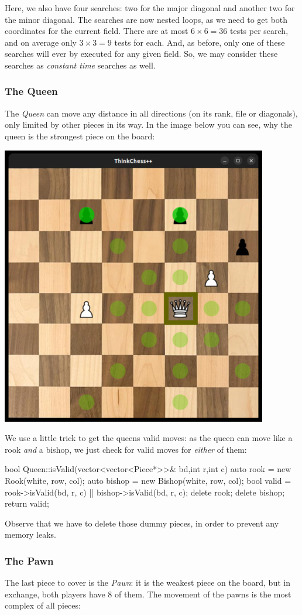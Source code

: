 Here, we also have four searches: two for the major diagonal and another two for the minor
diagonal.
The searches are now nested loops, as we need to get both coordinates for the current field.
There are at most $6 \times 6 = 36$ tests per search, and on average only $3 \times 3 = 9$
tests for each.
And, as before, only one of these searches will ever by executed for any given field.
So, we may consider these searches as \emph{constant time} searches as well.

\subsubsection{The Queen}
The \emph{Queen} can move any distance in all directions (on its rank, file or diagonals),
only limited by other pieces in its way.
In the image below you can see, why the queen is the strongest piece on the board:

\begin{center}
\includegraphics[width=.5\linewidth]{img/queen.jpg}
\end{center}

We use a little trick to get the queens valid moves: as the queen can move like a rook
\emph{and} a bishop, we just check for valid moves for \emph{either} of them:

\begin{cpp}
bool Queen::isValid(vector<vector<Piece*>>& bd,int r,int c) {
  auto rook = new Rook(white, row, col);
  auto bishop = new Bishop(white, row, col);
  bool valid = rook->isValid(bd, r, c) || bishop->isValid(bd, r, c);
  delete rook;
  delete bishop;
  return valid;
}
\end{cpp}

Observe that we have to delete those dummy pieces, in order to prevent any memory leaks.

\subsubsection{The Pawn}
The last piece to cover is the \emph{Pawn}: it is the weakest piece on the board, but in
exchange, both players have 8 of them.
The movement of the pawns is the most complex of all pieces:

